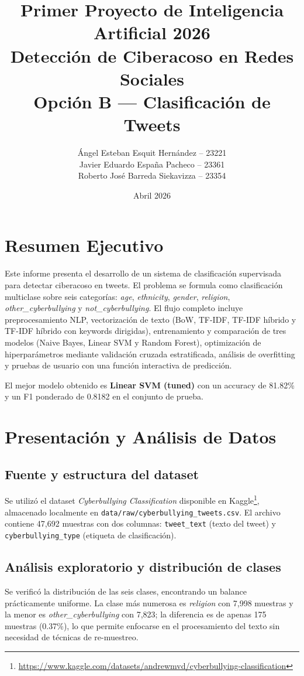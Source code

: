 ﻿\documentclass[12pt,a4paper]{article}
\title{\textbf{Primer Proyecto de Inteligencia Artificial 2026}\\
Detección de Ciberacoso en Redes Sociales\\[0.3cm]
\large Opción B --- Clasificación de Tweets}
\author{Ángel Esteban Esquit Hernández -- 23221\\
Javier Eduardo España Pacheco -- 23361\\
Roberto José Barreda Siekavizza -- 23354}
\date{Abril 2026}
\begin{document}
\maketitle
\tableofcontents
\newpage

\section{Resumen Ejecutivo}

Este informe presenta el desarrollo de un sistema de clasificación supervisada
para detectar ciberacoso en tweets. El problema se formula como clasificación
multiclase sobre seis categorías: \textit{age}, \textit{ethnicity},
\textit{gender}, \textit{religion}, \textit{other\_cyberbullying} y
\textit{not\_cyberbullying}. El flujo completo incluye preprocesamiento NLP,
vectorización de texto (BoW, TF-IDF, TF-IDF híbrido y TF-IDF híbrido con
keywords dirigidas), entrenamiento y comparación de tres modelos (Naive Bayes,
Linear SVM y Random Forest), optimización de hiperparámetros mediante
validación cruzada estratificada, análisis de overfitting y pruebas de
usuario con una función interactiva de predicción.

El mejor modelo obtenido es \textbf{Linear SVM (tuned)} con un accuracy de
81.82\% y un F1 ponderado de 0.8182 en el conjunto de prueba.

\section{Presentación y Análisis de Datos}

\subsection{Fuente y estructura del dataset}
Se utilizó el dataset \textit{Cyberbullying Classification} disponible en
Kaggle\footnote{\url{https://www.kaggle.com/datasets/andrewmvd/cyberbullying-classification}},
almacenado localmente en \texttt{data/raw/cyberbullying\_tweets.csv}.
El archivo contiene 47,692 muestras con dos columnas:
\texttt{tweet\_text} (texto del tweet) y \texttt{cyberbullying\_type}
(etiqueta de clasificación).

\subsection{Análisis exploratorio y distribución de clases}
Se verificó la distribución de las seis clases, encontrando un balance
prácticamente uniforme. La clase más numerosa es \textit{religion} con 7,998
muestras y la menor es \textit{other\_cyberbullying} con 7,823; la diferencia
es de apenas 175 muestras (0.37\%), lo que permite enfocarse en el
procesamiento del texto sin necesidad de técnicas de re-muestreo.
\end{document}

